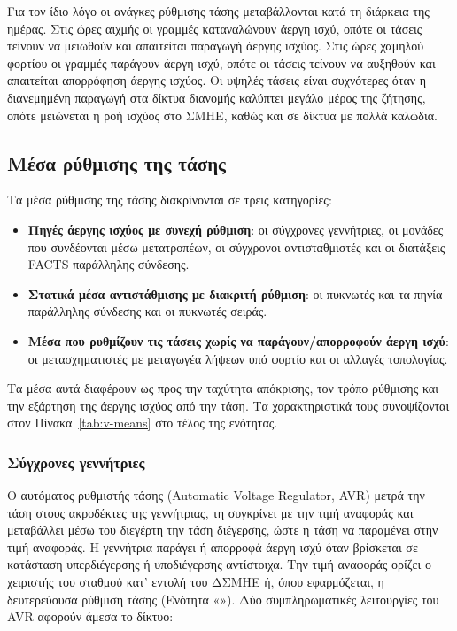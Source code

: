 Για τον ίδιο λόγο οι ανάγκες ρύθμισης τάσης μεταβάλλονται κατά τη διάρκεια της ημέρας. Στις
ώρες αιχμής οι γραμμές καταναλώνουν άεργη ισχύ, οπότε οι τάσεις τείνουν να μειωθούν και
απαιτείται παραγωγή άεργης ισχύος. Στις ώρες χαμηλού φορτίου οι γραμμές παράγουν άεργη ισχύ,
οπότε οι τάσεις τείνουν να αυξηθούν και απαιτείται απορρόφηση άεργης ισχύος. Οι υψηλές τάσεις
είναι συχνότερες όταν η διανεμημένη παραγωγή στα δίκτυα διανομής καλύπτει μεγάλο μέρος της
ζήτησης, οπότε μειώνεται η ροή ισχύος στο ΣΜΗΕ, καθώς και σε δίκτυα με πολλά καλώδια.

\subsection{Μέσα ρύθμισης της τάσης}
\label{sec:q-sources}

Τα μέσα ρύθμισης της τάσης διακρίνονται σε τρεις κατηγορίες:

\begin{itemize}
\item \textbf{Πηγές άεργης ισχύος με συνεχή ρύθμιση}: οι σύγχρονες γεννήτριες, οι μονάδες που
      συνδέονται μέσω μετατροπέων, οι σύγχρονοι αντισταθμιστές και οι διατάξεις FACTS
      παράλληλης σύνδεσης.
\item \textbf{Στατικά μέσα αντιστάθμισης με διακριτή ρύθμιση}: οι πυκνωτές και τα πηνία
      παράλληλης σύνδεσης και οι πυκνωτές σειράς.
\item \textbf{Μέσα που ρυθμίζουν τις τάσεις χωρίς να παράγουν/απορροφούν άεργη ισχύ}: οι
      μετασχηματιστές με μεταγωγέα λήψεων υπό φορτίο και οι αλλαγές τοπολογίας.
\end{itemize}

Τα μέσα αυτά διαφέρουν ως προς την ταχύτητα απόκρισης, τον τρόπο ρύθμισης και την εξάρτηση
της άεργης ισχύος από την τάση. Τα χαρακτηριστικά τους συνοψίζονται στον
Πίνακα~\ref{tab:v-means} στο τέλος της ενότητας.

\subsubsection{Σύγχρονες γεννήτριες}
\label{sec:sg}

Ο αυτόματος ρυθμιστής τάσης (Automatic Voltage Regulator, AVR) μετρά την τάση στους
ακροδέκτες της γεννήτριας, τη συγκρίνει με την τιμή αναφοράς και μεταβάλλει μέσω του διεγέρτη
την τάση διέγερσης, ώστε η τάση να παραμένει στην τιμή αναφοράς. Η γεννήτρια παράγει ή
απορροφά άεργη ισχύ όταν βρίσκεται σε κατάσταση υπερδιέγερσης ή υποδιέγερσης αντίστοιχα.
Την τιμή αναφοράς ορίζει ο χειριστής του σταθμού κατ' εντολή του ΔΣΜΗΕ ή, όπου
εφαρμόζεται, η δευτερεύουσα
ρύθμιση τάσης (Ενότητα «»). Δύο συμπληρωματικές λειτουργίες του AVR
αφορούν άμεσα το δίκτυο:

